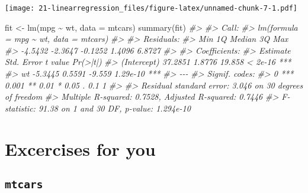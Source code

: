 \documentclass[
]{book}
\newenvironment{Shaded}{\begin{snugshade}}{\end{snugshade}}
\newcommand{\AttributeTok}[1]{\textcolor[rgb]{0.77,0.63,0.00}{#1}}
\newcommand{\CommentTok}[1]{\textcolor[rgb]{0.56,0.35,0.01}{\textit{#1}}}
\newcommand{\FunctionTok}[1]{\textcolor[rgb]{0.00,0.00,0.00}{#1}}
\newcommand{\NormalTok}[1]{#1}
\newcommand{\OtherTok}[1]{\textcolor[rgb]{0.56,0.35,0.01}{#1}}
\newcommand{\SpecialCharTok}[1]{\textcolor[rgb]{0.00,0.00,0.00}{#1}}
\begin{document}
\texttt{[image: 21-linearregression\_files/figure-latex/unnamed-chunk-7-1.pdf]}

\begin{Shaded}
\begin{Highlighting}[]
\NormalTok{fit }\OtherTok{\textless{}{-}} \FunctionTok{lm}\NormalTok{(mpg }\SpecialCharTok{\textasciitilde{}}\NormalTok{ wt, }\AttributeTok{data =}\NormalTok{ mtcars)}
\FunctionTok{summary}\NormalTok{(fit)}
\CommentTok{\#\textgreater{} }
\CommentTok{\#\textgreater{} Call:}
\CommentTok{\#\textgreater{} lm(formula = mpg \textasciitilde{} wt, data = mtcars)}
\CommentTok{\#\textgreater{} }
\CommentTok{\#\textgreater{} Residuals:}
\CommentTok{\#\textgreater{}     Min      1Q  Median      3Q     Max }
\CommentTok{\#\textgreater{} {-}4.5432 {-}2.3647 {-}0.1252  1.4096  6.8727 }
\CommentTok{\#\textgreater{} }
\CommentTok{\#\textgreater{} Coefficients:}
\CommentTok{\#\textgreater{}             Estimate Std. Error t value Pr(\textgreater{}|t|)    }
\CommentTok{\#\textgreater{} (Intercept)  37.2851     1.8776  19.858  \textless{} 2e{-}16 ***}
\CommentTok{\#\textgreater{} wt           {-}5.3445     0.5591  {-}9.559 1.29e{-}10 ***}
\CommentTok{\#\textgreater{} {-}{-}{-}}
\CommentTok{\#\textgreater{} Signif. codes:  }
\CommentTok{\#\textgreater{} 0 \textquotesingle{}***\textquotesingle{} 0.001 \textquotesingle{}**\textquotesingle{} 0.01 \textquotesingle{}*\textquotesingle{} 0.05 \textquotesingle{}.\textquotesingle{} 0.1 \textquotesingle{} \textquotesingle{} 1}
\CommentTok{\#\textgreater{} }
\CommentTok{\#\textgreater{} Residual standard error: 3.046 on 30 degrees of freedom}
\CommentTok{\#\textgreater{} Multiple R{-}squared:  0.7528, Adjusted R{-}squared:  0.7446 }
\CommentTok{\#\textgreater{} F{-}statistic: 91.38 on 1 and 30 DF,  p{-}value: 1.294e{-}10}
\end{Highlighting}
\end{Shaded}

\hypertarget{excercises-for-you}{%
\section{\texorpdfstring{Excercises for \textbf{you}}{Excercises for you}}\label{excercises-for-you}}

\hypertarget{mtcars}{%
\subsection{\texorpdfstring{\texttt{mtcars}}{mtcars}}\label{mtcars}}
\end{document}
